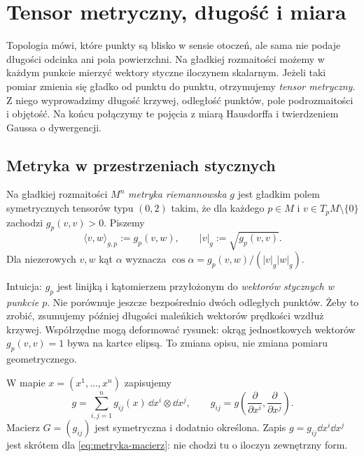 \chapter{Tensor metryczny, długość i miara}
\label{ch:metryka-riemannowska}

Topologia mówi, które punkty są blisko w sensie otoczeń,
ale sama nie podaje długości odcinka ani pola powierzchni.
Na gładkiej rozmaitości możemy w każdym punkcie mierzyć
wektory styczne iloczynem skalarnym. Jeżeli taki pomiar
zmienia się gładko od punktu do punktu, otrzymujemy
\emph{tensor metryczny}. Z niego wyprowadzimy długość
krzywej, odległość punktów, pole podrozmaitości i objętość.
Na końcu połączymy te pojęcia z miarą Hausdorffa
i twierdzeniem Gaussa o dywergencji.

\section{Metryka w przestrzeniach stycznych}
\label{sec:metryka-definicja}

\begin{definicja}
\label{def:metryka-riemannowska}
Na gładkiej rozmaitości $M^n$ \emph{metryka riemannowska}
$g$ jest gładkim polem symetrycznych tensorów typu $(0,2)$
takim, że dla każdego $p\in M$ i $v\in T_pM\setminus\{0\}$
zachodzi $g_p(v,v)>0$. Piszemy
\[
 \langle v,w\rangle_{g,p}:=g_p(v,w),
 \qquad |v|_g:=\sqrt{g_p(v,v)}.
\]
Dla niezerowych $v,w$ kąt $\alpha$ wyznacza
$\cos\alpha=g_p(v,w)/(|v|_g|w|_g)$.
\end{definicja}

Intuicja: $g_p$ jest linijką i kątomierzem przyłożonym
do \emph{wektorów stycznych w punkcie $p$}. Nie porównuje
jeszcze bezpośrednio dwóch odległych punktów. Żeby to zrobić,
zsumujemy później długości maleńkich wektorów prędkości
wzdłuż krzywej. Współrzędne mogą deformować rysunek:
okrąg jednostkowych wektorów $g_p(v,v)=1$ bywa na kartce
elipsą. To zmiana opisu, nie zmiana pomiaru geometrycznego.

W mapie $x=(x^1,\ldots,x^n)$ zapisujemy
\begin{equation}\label{eq:metryka-macierz}
 g=\sum_{i,j=1}^n g_{ij}(x)\,\dd x^i\otimes\dd x^j,
 \qquad g_{ij}=g\!\left(\frac{\partial}{\partial x^i},
                          \frac{\partial}{\partial x^j}\right).
\end{equation}
Macierz $G=(g_{ij})$ jest symetryczna i dodatnio określona.
Zapis $g=g_{ij}\dd x^i\dd x^j$ jest skrótem
dla \eqref{eq:metryka-macierz}: nie chodzi tu o iloczyn
zewnętrzny form.

